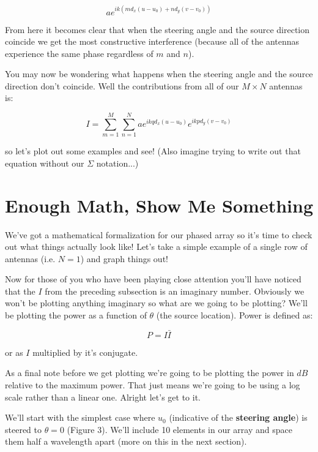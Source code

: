 \documentclass[10pt,a5paper]{book}
\begin{document}
\begin{equation}
ae^{ik(md_x(u-u_0)+nd_y(v-v_0))}
\end{equation}

From here it becomes clear that when the steering angle and the source direction coincide we get the most constructive interference (because all of the antennas experience the same phase regardless of $m$ and $n$).

You may now be wondering what happens when the steering angle and the source direction don't coincide. Well the contributions from all of our $M\times N$ antennas is:

\begin{equation}
I=\sum_{m=1}^M \sum_{n=1}^N  ae^{ikqd_x(u-u_0)}e^{ikpd_y(v-v_0)}
\end{equation}

so let's plot out some examples and see! (Also imagine trying to write out that equation without our $\Sigma$ notation...)

\section{Enough Math, Show Me Something}
We've got a mathematical formalization for our phased array so it's time to check out what things actually look like! Let's take a simple example of a single row of antennas (i.e. $N=1$) and graph things out!

Now for those of you who have been playing close attention you'll have noticed that the $I$ from the preceding subsection is an imaginary number. Obviously we won't be plotting anything imaginary so what are we going to be plotting? We'll be plotting the power as a function of $\theta$ (the source location). Power is defined as:

\begin{equation}
P=I\bar{I}
\end{equation}

or as $I$ multiplied by it's conjugate. 

As a final note before we get plotting we're going to be plotting the power in $dB$ relative to the maximum power. That just means we're going to be using a log scale rather than a linear one. Alright let's get to it.

We'll start with the simplest case where $u_0$ (indicative of the \textbf{steering angle}) is steered to $\theta=0$ (Figure 3). We'll include 10 elements in our array and space them half a wavelength apart (more on this in the next section). 
\end{document}
